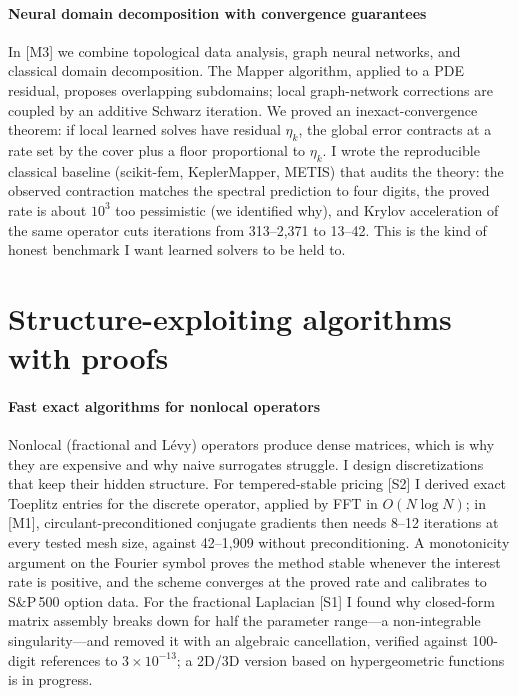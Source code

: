 \documentclass[11pt]{article}
\newcommand{\rc}[1]{\textcolor{accent}{[#1]}}
\begin{document}
\paragraph{Neural domain decomposition with convergence guarantees}
In \rc{M3} we combine topological data analysis, graph neural networks, and
classical domain decomposition. %
The Mapper algorithm, applied to a PDE residual, proposes overlapping
subdomains; local graph-network corrections are coupled by an additive Schwarz
iteration. We proved an inexact-convergence theorem: if local learned solves
have residual $\eta_k$, the global error contracts at a rate set by the cover
plus a floor proportional to $\eta_k$. I wrote the reproducible classical
baseline (scikit-fem, KeplerMapper, METIS) that audits the theory: the observed
contraction matches the spectral prediction to four digits, the proved rate
is about $10^3$ too pessimistic (we identified why), and Krylov acceleration of
the same operator cuts iterations from 313--2{,}371 to 13--42. This is the kind
of honest benchmark I want learned solvers to be held to.

\section{Structure-exploiting algorithms with proofs}

\paragraph{Fast exact algorithms for nonlocal operators}
Nonlocal (fractional and L\'evy) operators produce dense matrices, which is
why they are expensive and why naive surrogates struggle. I design
discretizations that keep their hidden structure. For tempered-stable pricing
\rc{S2} I derived exact Toeplitz entries for the discrete operator, applied by
FFT in $O(N\log N)$; in \rc{M1}, circulant-preconditioned conjugate gradients
then needs 8--12 iterations at every tested mesh size, against 42--1{,}909 without
preconditioning. A monotonicity argument on the Fourier symbol proves the
method stable whenever the interest rate is positive, and the scheme converges
at the proved rate and calibrates to S\&P\,500 option data. For the fractional
Laplacian \rc{S1} I found why closed-form matrix assembly breaks down for half
the parameter range---a non-integrable singularity---and removed it with an
algebraic cancellation, verified against 100-digit references to
$3\times10^{-13}$; a 2D/3D version based on hypergeometric functions is in
progress. %
\end{document}
